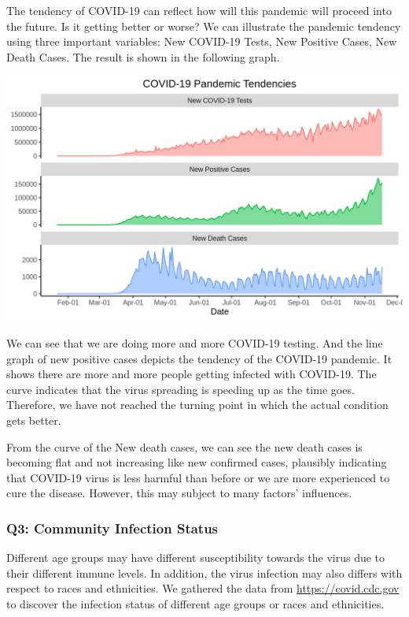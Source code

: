 \documentclass[
]{article}
\begin{document}
The tendency of COVID-19 can reflect how will this pandemic will proceed
into the future. Is it getting better or worse? We can illustrate the
pandemic tendency using three important variables: New COVID-19 Tests,
New Positive Cases, New Death Cases. The result is shown in the
following graph.

\begin{center}\includegraphics[width=1\linewidth]{tendency} \end{center}

We can see that we are doing more and more COVID-19 testing. And the
line graph of new positive cases depicts the tendency of the COVID-19
pandemic. It shows there are more and more people getting infected with
COVID-19. The curve indicates that the virus spreading is speeding up as
the time goes. Therefore, we have not reached the turning point in which
the actual condition gets better.

From the curve of the New death cases, we can see the new death cases is
becoming flat and not increasing like new confirmed cases, plausibly
indicating that COVID-19 virus is less harmful than before or we are
more experienced to cure the disease. However, this may subject to many
factors' influences.

\hypertarget{q3-community-infection-status}{%
\subsubsection{Q3: Community Infection
Status}\label{q3-community-infection-status}}

Different age groups may have different susceptibility towards the virus
due to their different immune levels. In addition, the virus infection
may also differs with respect to races and ethnicities. We gathered the
data from \url{https://covid.cdc.gov} to discover the infection status
of different age groups or races and ethnicities.
\end{document}
